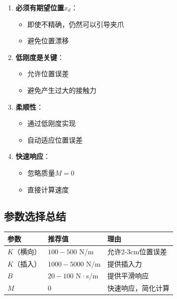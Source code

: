 \documentclass[12pt,a4paper]{article}
\begin{document}
\begin{enumerate}
\item \textbf{必须有期望位置$x_d$}：
\begin{itemize}
\item 即使不精确，仍然可以引导夹爪
\item 避免位置漂移
\end{itemize}

\item \textbf{低刚度是关键}：
\begin{itemize}
\item 允许位置误差
\item 避免产生过大的接触力
\end{itemize}

\item \textbf{柔顺性}：
\begin{itemize}
\item 通过低刚度实现
\item 自动适应位置误差
\end{itemize}

\item \textbf{快速响应}：
\begin{itemize}
\item 忽略质量$M = 0$
\item 直接计算速度
\end{itemize}
\end{enumerate}

\subsection{参数选择总结}

\begin{center}
\begin{tabular}{|l|l|l|}
\hline
\textbf{参数} & \textbf{推荐值} & \textbf{理由} \\
\hline
$K$（横向） & $100-500$ N/m & 允许2-3cm位置误差 \\
\hline
$K$（插入） & $1000-5000$ N/m & 提供插入力 \\
\hline
$B$ & $20-100$ N·s/m & 提供平滑响应 \\
\hline
$M$ & $0$ & 快速响应，简化计算 \\
\hline
\end{tabular}
\end{center}
\end{document}
